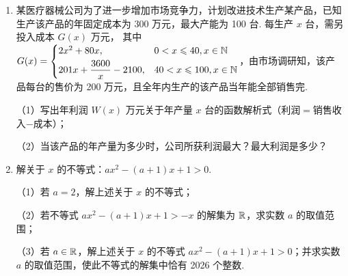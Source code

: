 \documentclass[a4paper,11pt]{article}
\begin{document}
\begin{enumerate}
\item 某医疗器械公司为了进一步增加市场竞争力，计划改进技术生产某产品，已知生产该产品的年固定成本为 300 万元，最大产能为 100 台. 每生产 $x$ 台，需另投入成本 $G(x)$ 万元，
其中 $G(x)=\begin{cases}2x^2+80x,&0<x\leqslant40,x\in\mathbb{N}\\[3pt]201x+\dfrac{3600}{x}-2100,&40<x\leqslant100,x\in\mathbb{N}\end{cases}$，由市场调研知，该产品每台的售价为 200 万元，且全年内生产的该产品当年能全部销售完.

（1）写出年利润 $W(x)$ 万元关于年产量 $x$ 台的函数解析式（利润$=$销售收入$-$成本）；

（2）当该产品的年产量为多少时，公司所获利润最大？最大利润是多少？

\ifanswer
\solbegin
{}
\solend
\fi

\item 解关于 $x$ 的不等式：$ax^2-(a+1)x+1>0$.

（1）若 $a=2$，解上述关于 $x$ 的不等式；

（2）若不等式 $ax^2-(a+1)x+1>-x$ 的解集为 $\mathbb{R}$，求实数 $a$ 的取值范围；

（3）若 $a\in\mathbb{R}$，解上述关于 $x$ 的不等式 $ax^2-(a+1)x+1>0$；并求实数 $a$ 的取值范围，使此不等式的解集中恰有 2026 个整数.


\end{enumerate}
\end{document}
